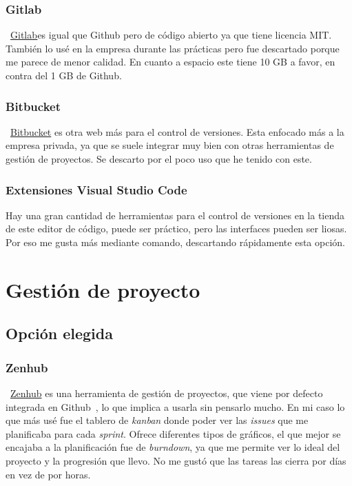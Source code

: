 \subsubsection{Gitlab}
~\href{https://gitlab.com/}{Gitlab}es igual que Github pero de código abierto ya que tiene licencia MIT. También lo usé en la empresa durante las prácticas pero fue descartado porque me parece de menor calidad. En cuanto a espacio este tiene 10 GB a favor, en contra del 1 GB de Github.

\subsubsection{Bitbucket}
~\href{https://bitbucket.org/product//}{Bitbucket} es otra web más para el control de versiones. Esta enfocado más a la empresa privada, ya que se suele integrar muy bien con otras herramientas de gestión de proyectos. Se descarto por el poco uso que he tenido con este.

\subsubsection{Extensiones Visual Studio Code}
Hay una gran cantidad de herramientas para el control de versiones en la tienda de este editor de código, puede ser práctico, pero las interfaces pueden ser liosas. Por eso me gusta más mediante comando, descartando rápidamente esta opción.


\section{Gestión de proyecto}

\subsection{Opción elegida}

\subsubsection{Zenhub}\label{zenhub}
~\href{https://bitbucket.org/product//}{Zenhub} es una herramienta de gestión de proyectos, que viene por defecto integrada en Github~\pageref{github}, lo que implica a usarla sin pensarlo mucho. En mi caso lo que más usé fue el tablero de \emph{kanban} donde poder ver las \emph{issues} que me planificaba para cada \emph{sprint}. Ofrece diferentes tipos de gráficos, el que mejor se encajaba a la planificación fue de \emph{burndown}, ya que me permite ver lo ideal del proyecto y la progresión que llevo. No me gustó que las tareas las cierra por días en vez de por horas.

